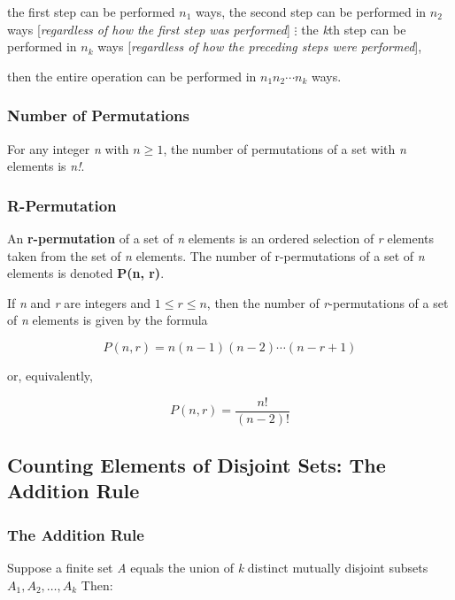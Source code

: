 \documentclass{article}
\begin{document}
\begin{center}
the first step can be performed $n_1$ ways,
the second step can be performed in $n_2$ ways [\textit{regardless of how the first step was performed}]
$\vdots$
the \textit{k}th step can be performed in $n_k$ ways [\textit{regardless of how the preceding steps were performed}],
\end{center}

then the entire operation can be performed in $n_1 n_2 \cdots n_k$ ways.

\subsubsection{Number of Permutations}
For any integer \textit{n} with $n \geq 1$, the number of permutations of a set with \textit{n} elements is \textit{n!}.

\subsubsection{R-Permutation}
An \textbf{r-permutation} of a set of \textit{n} elements is an ordered selection of \textit{r} elements taken from the set of \textit{n} elements. The number of r-permutations of a set of \textit{n} elements is denoted \textbf{P(n, r)}.

If \textit{n} and \textit{r} are integers and $1 \leq r \leq n$, then the number of \textit{r}-permutations of a set of \textit{n} elements is given by the formula

\begin{equation*}
P(n, r) = n(n - 1)(n - 2) \cdots (n - r + 1)
\end{equation*}

or, equivalently,

\begin{equation*}
P(n, r) = \frac{n!}{(n - 2)!}
\end{equation*}

\subsection{Counting Elements of Disjoint Sets: The Addition Rule}
\subsubsection*{The Addition Rule}
Suppose a finite set \textit{A} equals the union of \textit{k} distinct mutually disjoint subsets $A_1, A_2, \ldots , A_k$ Then:
\end{document}
